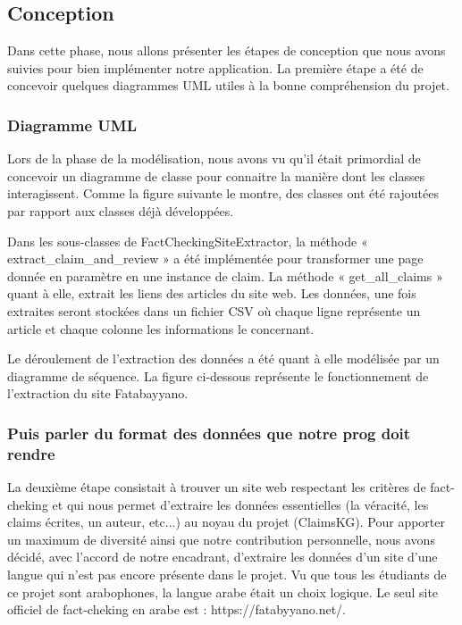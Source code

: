 \documentclass[oneside,13pt,a4paper]{report}
\begin{document}
\subsection{Conception}

Dans cette phase, nous allons présenter les étapes de conception que nous avons suivies pour bien implémenter notre application. La première étape a été de concevoir quelques diagrammes UML utiles à la bonne compréhension du projet.

\subsubsection*{Diagramme UML}

Lors de la phase de la modélisation, nous avons vu qu'il était primordial de concevoir un diagramme de classe pour connaitre la manière dont les classes interagissent. Comme la figure suivante le montre, des classes ont été rajoutées par rapport aux classes déjà développées.
 
Dans les sous-classes de FactCheckingSiteExtractor, la méthode « extract_claim_and_review » a été implémentée pour transformer une page donnée en paramètre en une instance de claim. La méthode « get_all_claims » quant à elle, extrait les liens des articles du site web. Les données, une fois extraites seront stockées dans un fichier CSV où chaque ligne représente un article et chaque colonne les informations le concernant.


Le déroulement de l'extraction des données a été quant à elle modélisée par un diagramme de séquence. La figure ci-dessous représente le fonctionnement de l'extraction du site Fatabayyano.


\subsubsection*{Puis parler du format des données que notre prog doit rendre}

La deuxième étape consistait à trouver un site web respectant les critères de fact-cheking et qui nous permet d'extraire les données essentielles (la véracité, les claims écrites, un auteur, etc...) au noyau du projet (ClaimsKG). Pour apporter un maximum de diversité ainsi que notre contribution personnelle, nous avons décidé, avec l'accord de notre encadrant, d'extraire les données d'un site d'une langue qui n'est pas encore présente dans le projet. Vu que tous les étudiants de ce projet sont arabophones, la langue arabe était un choix logique. Le seul site officiel de fact-cheking en arabe est : https://fatabyyano.net/. 
\end{document}

